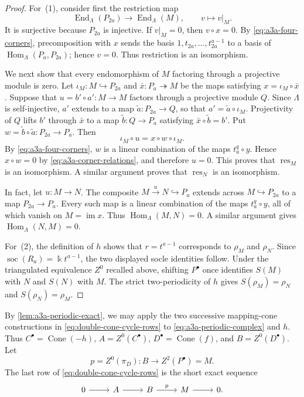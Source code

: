 \documentclass[a4paper,11pt,reqno]{amsart}
\theoremstyle{definition}
\theoremstyle{plain}
\numberwithin{equation}{section}
\newcommand{\im}{\operatorname{im}}
\newcommand{\Hom}{\operatorname{Hom}}
\newcommand{\End}{\operatorname{End}}
\newcommand{\kk}{\Bbbk}
\begin{document}
\begin{proof}
For~\textup{(1)}, consider first the restriction map
\[
 \End_\Lambda(P_{2a})\longrightarrow\End_\Lambda(M),
 \qquad v\longmapsto v|_M.
\]
It is surjective because \(P_{2a}\) is injective.  If \(v|_M=0\), then
\(v\circ x=0\).  By \eqref{eq:a3a-four-corners}, precomposition with
\(x\) sends the basis \(1,t_{2a},\ldots,t_{2a}^{a-1}\) to a basis of
\(\Hom_\Lambda(P_a,P_{2a})\); hence \(v=0\).  Thus restriction is an
isomorphism.

We next show that every endomorphism of \(M\) factoring through a
projective module is zero.  Let
\(\iota_M:M\hookrightarrow P_{2a}\) and
\(\bar x:P_a\twoheadrightarrow M\) be the maps satisfying
\(x=\iota_M\circ\bar x\).  Suppose that
\(u=b'\circ a':M\to M\) factors through a projective module \(Q\).
Since \(\Lambda\) is self-injective, \(a'\) extends to a map
\(\widetilde a:P_{2a}\to Q\), so that
\(a'=\widetilde a\circ\iota_M\).  Projectivity of \(Q\) lifts \(b'\)
through \(\bar x\) to a map \(\widetilde b:Q\to P_a\) satisfying
\(\bar x\circ\widetilde b=b'\).  Put
\(w=\widetilde b\circ\widetilde a:P_{2a}\to P_a\).  Then
\[
 \iota_M\circ u=x\circ w\circ\iota_M.
\]
By \eqref{eq:a3a-four-corners}, \(w\) is a linear combination of the
maps \(t_a^q\circ y\).  Hence \(x\circ w=0\) by
\eqref{eq:a3a-corner-relations}, and therefore \(u=0\).
This proves that \(\operatorname{res}_M\) is an isomorphism.  A similar
argument proves that \(\operatorname{res}_N\) is an isomorphism.

In fact, let \(u:M\to N\).  The composite
\(M\xrightarrow{u}N\hookrightarrow P_a\) extends across
\(M\hookrightarrow P_{2a}\) to a map \(P_{2a}\to P_a\).  Every such map
is a linear combination of the maps \(t_a^q\circ y\), all of which
vanish on \(M=\im x\).  Thus \(\Hom_\Lambda(M,N)=0\).  A similar argument
gives \(\Hom_\Lambda(N,M)=0\).

For~\textup{(2)}, the definition of \(h\) shows that \(r=t^{a-1}\)
corresponds to \(\rho_M\) and \(\rho_N\).  Since
\(\operatorname{soc}(R_a)=\kk t^{a-1}\), the two displayed socle
identities follow.  Under the triangulated equivalence \(Z^0\) recalled
above, shifting \(P^\bullet\) once identifies \(S(M)\) with \(N\) and
\(S(N)\) with \(M\).  The strict two-periodicity of \(h\) gives
\(S(\rho_M)=\rho_N\) and \(S(\rho_N)=\rho_M\).
\end{proof}

By \cref{lem:a3a-periodic-exact}, we may apply the two successive mapping-cone constructions in
\eqref{eq:double-cone-cycle-rows} to \eqref{eq:a3a-periodic-complex} and
\(h\).  Thus
\(C^\bullet=\operatorname{Cone}(-h)\), \(A=Z^0(C^\bullet)\),
\(D^\bullet=\operatorname{Cone}(f)\), and
\(B=Z^0(D^\bullet)\).  Let
\[
 p=Z^0(\pi_D):B\longrightarrow Z^2(P^\bullet)=M.
\]
The last row of \eqref{eq:double-cone-cycle-rows} is the short exact
sequence
\begin{equation}
\label{eq:a3a-detector-sequence}
\begin{tikzcd}[column sep=2.5em]
0\arrow[r]&A\arrow[r]&B\arrow[r,"p"]&M\arrow[r]&0.
\end{tikzcd}
\end{equation}
\end{document}
